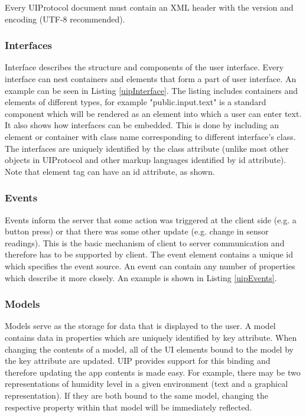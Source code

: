 

Every UIProtocol document must contain an XML header with the version and encoding (UTF-8 recommended).

\subsubsection{Interfaces}
Interface describes the structure and components of the user interface. Every interface can nest containers and elements that form a part of user interface. An example can be seen in Listing \ref{uipInterface}. The listing includes containers and elements of different types, for example "public.input.text" is a standard component which will be rendered as an element into which a user can enter text. It also shows how interfaces can be embedded. This is done by including an element or container with class name corresponding to different interface's class. The interfaces are uniquely identified by the class attribute (unlike most other objects in UIProtocol and other markup languages identified by id attribute). Note that element tag can have an id attribute, as shown.\\



\subsubsection{Events}
Events inform the server that some action was triggered at the client side (e.g. a button press) or that there was some other update (e.g. change in sensor readings). This is the basic mechanism of client to server communication and therefore has to be supported by client. The event element contains a unique id which specifies the event source. An event can contain any number of properties which describe it more closely. An example is shown in Listing \ref{uipEvents}.


\subsubsection{Models}
Models serve as the storage for data that is displayed to the user. A model contains data in properties which are uniquely identified by key attribute. When changing the contents of a model, all of the UI elements bound to the model by the key attribute are updated. UIP provides support for this binding and therefore updating the app contents is made easy. For example, there may be two representations of humidity level in a given environment (text and a graphical representation). If they are both bound to the same model, changing the respective property within that model will be immediately reflected.

